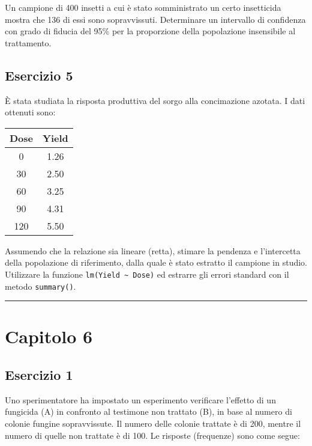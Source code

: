 \documentclass[a4paper,12pt,oneside]{book}
\begin{document}
Un campione di 400 insetti a cui è stato somministrato un certo insetticida mostra che 136 di essi sono sopravvissuti. Determinare un intervallo di confidenza con grado di fiducia del 95\% per la proporzione della popolazione insensibile al trattamento.

\hypertarget{esercizio-5-1}{%
\subsection{Esercizio 5}\label{esercizio-5-1}}

È stata studiata la risposta produttiva del sorgo alla concimazione azotata. I dati ottenuti sono:

\begin{longtable}[]{@{}cc@{}}
\toprule
Dose & Yield \\
\midrule
\endhead
0 & 1.26 \\
30 & 2.50 \\
60 & 3.25 \\
90 & 4.31 \\
120 & 5.50 \\
\bottomrule
\end{longtable}

Assumendo che la relazione sia lineare (retta), stimare la pendenza e l'intercetta della popolazione di riferimento, dalla quale è stato estratto il campione in studio. Utilizzare la funzione \texttt{lm(Yield\ \textasciitilde{}\ Dose)} ed estrarre gli errori standard con il metodo \texttt{summary()}.

\begin{center}\rule{0.5\linewidth}{0.5pt}\end{center}

\hypertarget{capitolo-6}{%
\section{Capitolo 6}\label{capitolo-6}}

\hypertarget{esercizio-1-4}{%
\subsection{Esercizio 1}\label{esercizio-1-4}}

Uno sperimentatore ha impostato un esperimento verificare l'effetto di un fungicida (A) in confronto al testimone non trattato (B), in base al numero di colonie fungine sopravvissute. Il numero delle colonie trattate è di 200, mentre il numero di quelle non trattate è di 100. Le risposte (frequenze) sono come segue:
\end{document}

